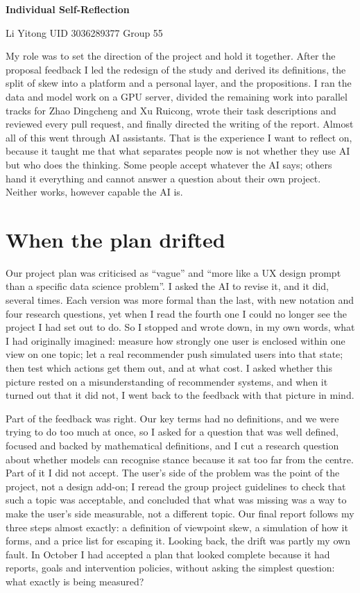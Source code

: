 \documentclass[11pt,a4paper]{article}
\begin{document}
{\centering
  {\LARGE\bfseries Individual Self-Reflection\par}
  \vspace{0.45em}
  {\color{mute}Li Yitong \quad\textperiodcentered\quad UID 3036289377 \quad\textperiodcentered\quad Group 55\par}
}
\vspace{0.8em}
My role was to set the direction of the project and hold it together. After the proposal feedback I led the redesign of the study and derived its definitions, the split of skew into a platform and a personal layer, and the propositions. I ran the data and model work on a GPU server, divided the remaining work into parallel tracks for Zhao Dingcheng and Xu Ruicong, wrote their task descriptions and reviewed every pull request, and finally directed the writing of the report. Almost all of this went through AI assistants. That is the experience I want to reflect on, because it taught me that what separates people now is not whether they use AI but who does the thinking. Some people accept whatever the AI says; others hand it everything and cannot answer a question about their own project. Neither works, however capable the AI is.

\section{When the plan drifted}

Our project plan was criticised as ``vague'' and ``more like a UX design prompt than a specific data science problem''. I asked the AI to revise it, and it did, several times. Each version was more formal than the last, with new notation and four research questions, yet when I read the fourth one I could no longer see the project I had set out to do. So I stopped and wrote down, in my own words, what I had originally imagined: measure how strongly one user is enclosed within one view on one topic; let a real recommender push simulated users into that state; then test which actions get them out, and at what cost. I asked whether this picture rested on a misunderstanding of recommender systems, and when it turned out that it did not, I went back to the feedback with that picture in mind.

Part of the feedback was right. Our key terms had no definitions, and we were trying to do too much at once, so I asked for a question that was well defined, focused and backed by mathematical definitions, and I cut a research question about whether models can recognise stance because it sat too far from the centre. Part of it I did not accept. The user's side of the problem was the point of the project, not a design add-on; I reread the group project guidelines to check that such a topic was acceptable, and concluded that what was missing was a way to make the user's side measurable, not a different topic. Our final report follows my three steps almost exactly: a definition of viewpoint skew, a simulation of how it forms, and a price list for escaping it. Looking back, the drift was partly my own fault. In October I had accepted a plan that looked complete because it had reports, goals and intervention policies, without asking the simplest question: what exactly is being measured?
\end{document}
